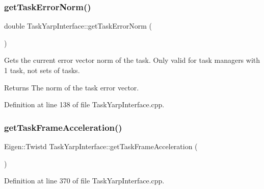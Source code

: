 \hypertarget{classocra_1_1TaskYarpInterface_af42ea4ecfb28af2f865efdfd40e5dc85}{}\label{classocra_1_1TaskYarpInterface_af42ea4ecfb28af2f865efdfd40e5dc85} 
\subsubsection{\texorpdfstring{get\+Task\+Error\+Norm()}{getTaskErrorNorm()}}
{\footnotesize\ttfamily double Task\+Yarp\+Interface\+::get\+Task\+Error\+Norm (\begin{DoxyParamCaption}{ }\end{DoxyParamCaption})}

Gets the current error vector norm of the task.  Only valid for task managers with 1 task, not sets of tasks.

\begin{DoxyReturn}{Returns}
The norm of the task error vector. 
\end{DoxyReturn}


Definition at line 138 of file Task\+Yarp\+Interface.\+cpp.

\hypertarget{classocra_1_1TaskYarpInterface_a59a7442dac9b971d36ba792b05d2afba}{}\label{classocra_1_1TaskYarpInterface_a59a7442dac9b971d36ba792b05d2afba} 
\subsubsection{\texorpdfstring{get\+Task\+Frame\+Acceleration()}{getTaskFrameAcceleration()}}
{\footnotesize\ttfamily Eigen\+::\+Twistd Task\+Yarp\+Interface\+::get\+Task\+Frame\+Acceleration (\begin{DoxyParamCaption}{ }\end{DoxyParamCaption})}



Definition at line 370 of file Task\+Yarp\+Interface.\+cpp.

\hypertarget{classocra_1_1TaskYarpInterface_a68eee445c141dec3251ab40a38314c81}{}\label{classocra_1_1TaskYarpInterface_a68eee445c141dec3251ab40a38314c81} 
